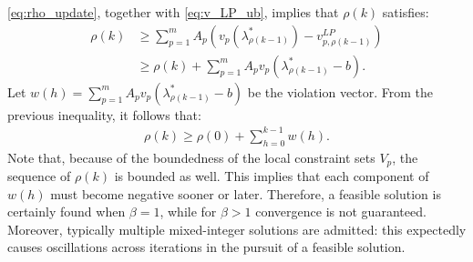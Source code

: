 \ref{eq:rho_update}, together with \ref{eq:v_LP_ub}, implies that $\rho(k)$ satisfies:
\begin{align*}
    \rho(k) &\geq \sum_{p = 1}^m A_p (v_p(\lambda_{\rho(k-1)}^*) - v_{p, \rho(k-1)}^{LP})\\
    &\geq \rho(k) + \sum_{p = 1}^m A_p v_p (\lambda^*_{\rho(k-1)} - b).
\end{align*}
Let $w(h) = \sum_{p = 1}^m A_p v_p (\lambda^*_{\rho(k-1)} - b)$ be the violation vector. From the previous inequality, it follows that:
\begin{align*}
    \rho(k) \geq \rho(0) + \sum_{h = 0}^{k-1} w(h).
\end{align*}
Note that, because of the boundedness of the local constraint sets $V_p$, the sequence of $\rho(k)$ is bounded as well. This implies that each component of $w(h)$ must become negative sooner or later. Therefore, a feasible solution is certainly found when $\beta = 1$, while for $\beta > 1$ convergence is not guaranteed. Moreover, typically multiple mixed-integer solutions are admitted: this expectedly causes oscillations across iterations in the pursuit of a feasible solution. 